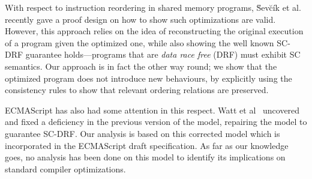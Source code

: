    With respect to instruction reordering in shared memory programs, \u{S}ev\u{c}\'{i}k et al.~\cite{Sevcik2} recently gave a proof design on how to show such optimizations are valid. However, this approach relies on the idea of reconstructing the original execution of a program given the optimized one, while also showing the well known SC-DRF guarantee holds---programs that are \textit{data race free} (DRF) must exhibit SC semantics. Our approach is in fact the other way round; we show that the optimized program does not introduce new behaviours, by explicitly using the consistency rules to show that relevant ordering relations are preserved.
   
   ECMAScript has also had some attention in this respect. Watt et al~\cite{WattC} uncovered and fixed a deficiency in the previous version of the model, repairing the model to guarantee SC-DRF. 
   Our analysis is based on this corrected model which is incorporated in the ECMAScript draft specification. As far as our knowledge goes, no analysis has been done on this model to identify its implications on standard compiler optimizations. 